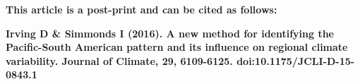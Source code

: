 \textbf{This article is a post-print and can be cited as follows:}    

\textbf{Irving D & Simmonds I (2016). A new method for identifying the Pacific-South American pattern and its influence on regional climate variability. Journal of Climate, 29, 6109-6125. doi:10.1175/JCLI-D-15-0843.1}